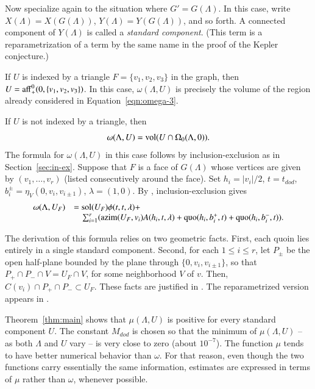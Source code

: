 \documentclass{article} %
\begin{document}
Now specialize again to the situation where $G'=G(\Lambda)$. In this
case, write $X(\Lambda)=X(G(\Lambda))$, $Y(\Lambda)=Y(G(\Lambda))$,
and so forth. A connected component of $Y(\Lambda)$ is called a
\emph{standard component}. (This term is a reparametrization of a term
by the same name in the proof of the Kepler conjecture.)

If $U$ is indexed by a triangle $F=\{v_1,v_2,v_3\}$ in the graph,
then $U = {\operatorname{aff}}_+^0(0,\{v_1,v_2,v_3\})$.  In this case,
$\omega(\Lambda,U)$ is precisely the volume of the region
already considered in Equation~\ref{eqn:omega-3}.

If $U$ is not indexed by a triangle, then
$$\omega(\Lambda,U) = {\operatorname{vol}}(U\cap\Omega_0(\Lambda,0)).$$
The formula for $\omega(\Lambda,U)$ in this case follows
by inclusion-exclusion as in Section~\ref{sec:in-ex}.  Suppose
that $F$ is a face of $G(\Lambda)$ whose vertices are given
by $(v_1,\ldots,v_r)$ (listed consecutively around the face).
Set $h_i=|v_i|/2$, $t=t_{dod}$, $b^\pm_{i}=\eta_V(0,v_i,v_{i\pm 1})$,
$\lambda=(1,0)$.
By \cite[Eqn.~7.12]{Hales:2006:DCG}, inclusion-exclusion gives
\begin{equation}\label{eqn:in-ex-U}
  \begin{array}{lll}
    \omega(\Lambda,U_F) &= \operatorname{sol}(U_F) \phi(t,t,\lambda) + \\
    &\quad \sum_{i=1}^r ({\operatorname{azim}}(U_F,v_i) A(h_i,t,\lambda) + \operatorname{quo}(h_i,b_i^+,t) +
    \operatorname{quo}(h_i,b_i^-,t)).
  \end{array}
\end{equation}

The derivation of this formula relies on two geometric facts. First,
each quoin lies entirely in a single standard component. Second, for
each $1\le i\le r$, let $P_{\pm}$ be the open half-plane bounded by
the plane through $\{0,v_i,v_{i\pm 1}\}$, so that $P_+\cap P_- \cap V
= U_F\cap V$, for some neighborhood $V$ of $v$. Then, $C(v_i)\cap
P_+\cap P_-\subset U_F$. These facts are justified in
\cite[Lemma~12.5]{Hales:2006:DCG}. The reparametrized version
appears in \cite{Hales:2002:Dodec}.

Theorem~\ref{thm:main} shows that $\mu(\Lambda,U)$ is positive
for every standard component $U$.  The constant
$M_{dod}$ is chosen so that the minimum of $\mu(\Lambda,U)$ -- as
both $\Lambda$ and $U$  vary -- is very close to zero (about $10^{-7}$).
The function $\mu$ tends to have better numerical behavior
than $\omega$.  For that reason, even though the two
functions carry essentially the same information,
estimates are expressed in terms
of $\mu$ rather than $\omega$, whenever possible.
\end{document}
